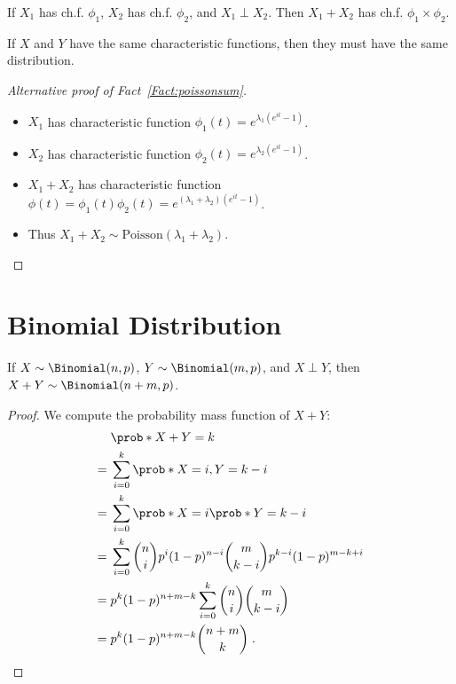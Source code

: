 \begin{fact}
If $X_1$ has ch.f. $\phi_1$, $X_2$ has ch.f. $\phi_2$, and $X_1\perp X_2$. Then
$X_1+X_2$ has ch.f. $\phi_1\times\phi_2$.
\end{fact}

\begin{fact}
If $X$ and $Y$ have the same characteristic functions, then they must have the same distribution.    
\end{fact}

\begin{proof}[Alternative proof of Fact~\ref{Fact:poissonsum}]\;
\begin{itemize}
\item $X_1$ has characteristic function $\phi_1(t)=e^{\lambda_1(e^{it}-1)}$.
\item $X_2$ has characteristic function $\phi_2(t)=e^{\lambda_2(e^{it}-1)}$.
\item $X_1+X_2$ has characteristic function $\phi(t)=\phi_1(t)\phi_2(t)=e^{(\lambda_1+\lambda_2)(e^{it}-1)}$. 
\item Thus $X_1+X_2\sim\mathrm{Poisson}(\lambda_1+\lambda_2)$.
\end{itemize}
\end{proof}

\section{Binomial Distribution}

\begin{fact}\label{Fact:binsum}
If $X\sim\Binomial(n,p)$, $Y\sim\Binomial(m,p)$, and $X\perp Y$, then $X+Y\sim\Binomial(n+m,p)$.
\end{fact}

\begin{proof}
We compute the probability mass function of $X+Y$:
\begin{align*}
& \prob*{X+Y=k}\\
={} & \sum_{i=0}^{k} \prob*{X=i,Y=k-i}\\
={} & \sum_{i=0}^{k} \prob*{X=i}\prob*{Y=k-i}\\
={} & \sum_{i=0}^{k} \binom{n}{i}p^i(1-p)^{n-i}
\binom{m}{k-i}p^{k-i}(1-p)^{m-k+i}\\
={} & p^k(1-p)^{n+m-k}\sum_{i=0}^{k} \binom{n}{i}\binom{m}{k-i}\\
={} & p^k(1-p)^{n+m-k}\binom{n+m}{k}\;.
\end{align*}
\end{proof}

